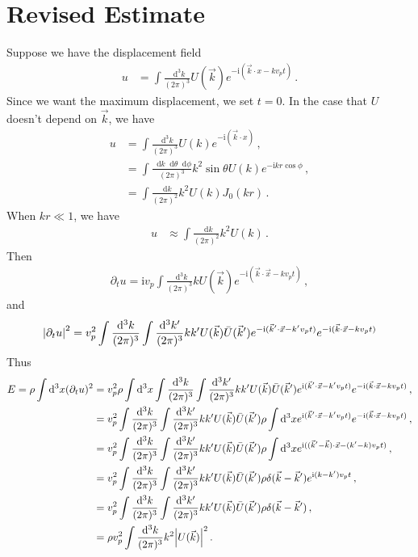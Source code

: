 \documentclass{article}
\newcommand*\diff{\mathop{}\!\mathrm{d}}
\newcommand*\te[1]{\text{#1}}
\newcommand*\f[2]{\frac{#1}{#2}}
\newcommand*\I{\te{i}}
\begin{document}
\section{Revised Estimate}
Suppose we have the displacement field
\begin{align}
u &= \int\f{\diff^3 k}{(2\pi)^3}U(\vec k)e^{-\I(\vec k\cdot x-k v_p t)}\,.
\end{align}
Since we want the maximum displacement, we set $t=0$. In the case that $U$ doesn't depend on $\vec k$, we have
\begin{align}
u &=\int\f{\diff^3 k}{(2\pi)^3}U(k)e^{-\I(\vec k\cdot x)}\,,\\
&=\int\f{\diff k\diff\theta\diff\phi}{(2\pi)^3}k^2\sin\theta U( k)e^{-\I k r \cos\phi}\,,\\
&=\int\f{\diff k}{(2\pi)^2}k^2U( k) J_0(k r)\,.
\end{align}
When $kr\ll 1$, we have
\begin{align}
u&\approx \int\f{\diff k}{(2\pi)^2}k^2U(k)\,.
\end{align}
Then
\begin{align}
\partial_t u =\I v_p\int\f{\diff^3 k}{(2\pi)^3}kU(\vec k)e^{-\I(\vec k\cdot \vec x-k v_p t)}\,,
\end{align}
and
\begin{align}
\abs{\partial_t u}^2 = v_p^2\int\f{\diff^3 k}{(2\pi)^3}\int\f{\diff^3 k'}{(2\pi)^3}kk'U(\vec k)\bar U(\vec k')e^{-\I(\vec k'\cdot \vec x-k' v_p t)}e^{-\I(\vec k\cdot \vec x-k v_p t)}
\end{align}
Thus
\begin{align}
E = \rho\int\diff^3 x (\partial_t u)^2 &= v_p^2\rho\int\diff^3 x\int\f{\diff^3 k}{(2\pi)^3}\int\f{\diff^3 k'}{(2\pi)^3}kk'U(\vec k)\bar U(\vec k')e^{\I(\vec k'\cdot \vec x-k' v_p t)}e^{-\I(\vec k\cdot \vec x-k v_p t)}\,,\\
&=v_p^2\int\f{\diff^3 k}{(2\pi)^3}\int\f{\diff^3 k'}{(2\pi)^3}kk'U(\vec k)\bar U(\vec k')\rho\int\diff^3 xe^{\I(\vec k'\cdot \vec x-k' v_p t)}e^{-\I(\vec k\cdot \vec x-k v_p t)}\,,\\
&=v_p^2\int\f{\diff^3 k}{(2\pi)^3}\int\f{\diff^3 k'}{(2\pi)^3}kk'U(\vec k)\bar U(\vec k')\rho\int\diff^3 xe^{\I((\vec k'-\vec k)\cdot \vec x-(k'-k) v_p t)}\,,\\
&=v_p^2\int\f{\diff^3 k}{(2\pi)^3}\int\f{\diff^3 k'}{(2\pi)^3}kk'U(\vec k)\bar U(\vec k')\rho \delta(\vec k-\vec k')e^{\I(k-k') v_p t}\,,\\
&=v_p^2\int\f{\diff^3 k}{(2\pi)^3}\int\f{\diff^3 k'}{(2\pi)^3}kk'U(\vec k)\bar U(\vec k')\rho \delta(\vec k-\vec k')\,,\\
&=\rho v_p^2\int\f{\diff^3 k}{(2\pi)^3}k^2\abs{U(\vec k)}^2\,.
\end{align}
\end{document}
